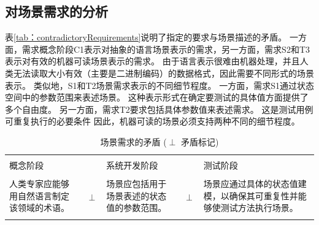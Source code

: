 \subsection{对场景需求的分析}
表\ref {tab：contradictoryRequirements}说明了指定的要求与场景描述的矛盾。
一方面，需求概念阶段C1表示对抽象的语言场景表示的需求，另一方面，需求S2和T3表示对有效的机器可读场景表示的需求。
由于语言表示很难由机器处理，并且人类无法读取大小有效（主要是二进制编码）的数据格式，因此需要不同形式的场景表示。
类似地，S1和T2场景需求表示的不同细节程度。
一方面，需求S1通过状态空间中的参数范围来表述场景。
这种表示形式在确定要测试的具体值方面提供了多个自由度。
另一方面，需求T2要求包括具体参数值来表述需求。
这是测试用例可重复执行的必要条件
因此，机器可读的场景必须支持两种不同的细节程度。

\begin{table}
	\centering
	\caption{场景需求的矛盾 ($\perp$ 矛盾标记)}
	\label{tab:contradictoryRequirements}
	\begin{tabularx}{\textwidth}{ X l X l X }
		\hline \\
		概念阶段 & & 系统开发阶段 & & 测试阶段 \\
		\hline \\
	人类专家应能够用自然语言制定该领域的术语。 & \multirow{3}{4pt}{$\perp$} &  场景应包括用于场景表述的状态值的参数范围。 & \multirow{3}{4pt}{$\perp$} & 场景应通过具体的状态值建模，以确保其可重复性并能够使测试方法执行场景。 \\
		\hline \\
	\end{tabularx}
\end{table}
